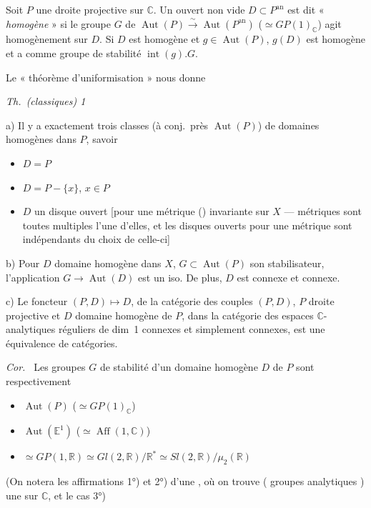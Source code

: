 \documentclass[11pt,a4paper]{article}
\begin{document}
Soit $P$ une droite projective sur $\mathbb{C}$. Un ouvert non vide $D \subset P^{\mathrm{an}}$ est dit « \emph{homogène} » si le groupe $G$ de $\operatorname{Aut}(P) \xrightarrow{\sim} \operatorname{Aut}(P^{\mathrm{an}})$ ($\simeq GP(1)_{\mathbb{C}}$) agit homogènement sur $D$. Si $D$ est homogène et $g \in \operatorname{Aut}(P)$, $g(D)$ est homogène et a comme groupe de stabilité $\operatorname{int}(g).G$.

Le « théorème d'uniformisation » nous donne

\emph{Th.\ (classiques) 1}

a) Il y a exactement trois classes (à conj.\ près  $\operatorname{Aut}(P)$) de domaines homogènes dans $P$, savoir
\begin{itemize}
\item[1°)] $D = P$
\item[2°)] $D = P - \{x\}$, $x \in P$
\item[3°)] $D$ un disque ouvert [pour une métrique () invariante sur $X$ —  métriques  sont toutes multiples l'une d'elles, et les disques ouverts  pour une  métrique sont indépendants du choix de celle-ci]
\end{itemize}

b) Pour $D$ domaine homogène dans $X$, $G \subset \operatorname{Aut}(P)$ son stabilisateur, l'application $G \to \operatorname{Aut}(D)$ est un iso. De plus, $D$ est connexe et  connexe.

c) Le foncteur $(P, D) \longmapsto D$, de la catégorie  des couples $(P, D)$, $P$ droite projective et $D$ domaine homogène de $P$, dans la catégorie  des \struck{\ill{}} espaces $\mathbb{C}$-analytiques réguliers de dim~1 connexes et simplement connexes, est une équivalence de catégories.

\emph{Cor.\ } Les groupes $G$ de stabilité d'un domaine homogène $D$ de $P$ sont respectivement
\begin{itemize}
\item[1)] $\operatorname{Aut}(P)$ ($\simeq GP(1)_{\mathbb{C}}$)
\item[2)] $\operatorname{Aut}(\mathbb{E}^{1})$ ($\simeq \operatorname{Aff}(1, \mathbb{C})$)
\item[3)] $\simeq GP(1, \mathbb{R}) \simeq Gl(2, \mathbb{R})/\mathbb{R}^{*} \simeq Sl(2, \mathbb{R})/\mu_2(\mathbb{R})$
\end{itemize}
(On notera les affirmations 1°) et 2°) d'une \ill{} \ill{}, où on trouve (\struck{\ill{}} groupes analytiques ) \ill{} une  sur $\mathbb{C}$, et le cas 3°)
\end{document}
